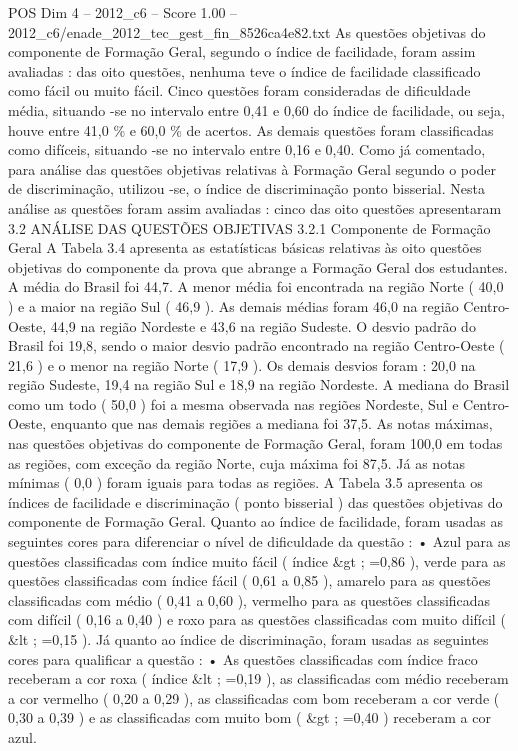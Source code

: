 \begin{textsample}{POS Dim 4 – 2012\_c6 – Score 1.00 – 2012\_c6/enade\_2012\_tec\_gest\_fin\_8526ca4e82.txt}
As questões objetivas do componente de Formação Geral, segundo o índice de facilidade, foram assim avaliadas : das oito questões, nenhuma teve o índice de facilidade classificado como fácil ou muito fácil.
Cinco questões foram consideradas de dificuldade média, situando -se no intervalo entre 0,41 e 0,60 do índice de facilidade, ou seja, houve entre 41,0 \% e 60,0 \% de acertos.
As demais questões foram classificadas como difíceis, situando -se no intervalo entre 0,16 e 0,40.
Como já comentado, para análise das questões objetivas relativas à Formação Geral segundo o poder de discriminação, utilizou -se, o índice de discriminação ponto bisserial.
Nesta análise as questões foram assim avaliadas : cinco das oito questões apresentaram 3.2 ANÁLISE DAS QUESTÕES OBJETIVAS 3.2.1 Componente de Formação Geral A Tabela 3.4 apresenta as estatísticas básicas relativas às oito questões objetivas do componente da prova que abrange a Formação Geral dos estudantes.
A média do Brasil foi 44,7.
A menor média foi encontrada na região Norte ( 40,0 ) e a maior na região Sul ( 46,9 ).
As demais médias foram 46,0 na região Centro-Oeste, 44,9 na região Nordeste e 43,6 na região Sudeste.
O desvio padrão do Brasil foi 19,8, sendo o maior desvio padrão encontrado na região Centro-Oeste ( 21,6 ) e o menor na região Norte ( 17,9 ).
Os demais desvios foram : 20,0 na região Sudeste, 19,4 na região Sul e 18,9 na região Nordeste.
A mediana do Brasil como um todo ( 50,0 ) foi a mesma observada nas regiões Nordeste, Sul e Centro-Oeste, enquanto que nas demais regiões a mediana foi 37,5.
As notas máximas, nas questões objetivas do componente de Formação Geral, foram 100,0 em todas as regiões, com exceção da região Norte, cuja máxima foi 87,5.
Já as notas mínimas ( 0,0 ) foram iguais para todas as regiões.
A Tabela 3.5 apresenta os índices de facilidade e discriminação ( ponto bisserial ) das questões objetivas do componente de Formação Geral.
Quanto ao índice de facilidade, foram usadas as seguintes cores para diferenciar o nível de dificuldade da questão : • Azul para as questões classificadas com índice muito fácil ( índice \&gt ; =0,86 ), verde para as questões classificadas com índice fácil ( 0,61 a 0,85 ), amarelo para as questões classificadas com médio ( 0,41 a 0,60 ), vermelho para as questões classificadas com difícil ( 0,16 a 0,40 ) e roxo para as questões classificadas com muito difícil ( \&lt ; =0,15 ).
Já quanto ao índice de discriminação, foram usadas as seguintes cores para qualificar a questão : • As questões classificadas com índice fraco receberam a cor roxa ( índice \&lt ; =0,19 ), as classificadas com médio receberam a cor vermelho ( 0,20 a 0,29 ), as classificadas com bom receberam a cor verde ( 0,30 a 0,39 ) e as classificadas com muito bom ( \&gt ; =0,40 ) receberam a cor azul.

\end{textsample}
